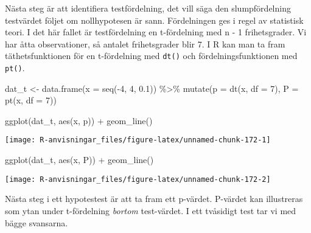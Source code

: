 \documentclass[
]{book}
\newenvironment{Shaded}{\begin{snugshade}}{\end{snugshade}}
\newcommand{\AttributeTok}[1]{\textcolor[rgb]{0.77,0.63,0.00}{#1}}
\newcommand{\DecValTok}[1]{\textcolor[rgb]{0.00,0.00,0.81}{#1}}
\newcommand{\FloatTok}[1]{\textcolor[rgb]{0.00,0.00,0.81}{#1}}
\newcommand{\FunctionTok}[1]{\textcolor[rgb]{0.00,0.00,0.00}{#1}}
\newcommand{\NormalTok}[1]{#1}
\newcommand{\OtherTok}[1]{\textcolor[rgb]{0.56,0.35,0.01}{#1}}
\newcommand{\SpecialCharTok}[1]{\textcolor[rgb]{0.00,0.00,0.00}{#1}}
\theoremstyle{definition}
\theoremstyle{definition}
\theoremstyle{definition}
\theoremstyle{definition}
\theoremstyle{remark}
\begin{document}
Nästa steg är att identifiera testfördelning, det vill säga den slumpfördelning testvärdet följet om nollhypotesen är sann. Fördelningen ges i regel av statistisk teori. I det här fallet är testfördelning en t-fördelning med n - 1 frihetsgrader. Vi har åtta observationer, så antalet frihetsgrader blir 7. I R kan man ta fram täthetsfunktionen för en t-fördelning med \texttt{dt()} och fördelningsfunktionen med \texttt{pt()}.

\begin{Shaded}
\begin{Highlighting}[]
\NormalTok{dat\_t }\OtherTok{\textless{}{-}} \FunctionTok{data.frame}\NormalTok{(}\AttributeTok{x =} \FunctionTok{seq}\NormalTok{(}\SpecialCharTok{{-}}\DecValTok{4}\NormalTok{, }\DecValTok{4}\NormalTok{, }\FloatTok{0.1}\NormalTok{)) }\SpecialCharTok{\%\textgreater{}\%} 
  \FunctionTok{mutate}\NormalTok{(}\AttributeTok{p =} \FunctionTok{dt}\NormalTok{(x, }\AttributeTok{df =} \DecValTok{7}\NormalTok{),}
         \AttributeTok{P =} \FunctionTok{pt}\NormalTok{(x, }\AttributeTok{df =} \DecValTok{7}\NormalTok{))}

\FunctionTok{ggplot}\NormalTok{(dat\_t, }\FunctionTok{aes}\NormalTok{(x, p)) }\SpecialCharTok{+}
  \FunctionTok{geom\_line}\NormalTok{()}
\end{Highlighting}
\end{Shaded}

\begin{center}\texttt{[image: R-anvisningar\_files/figure-latex/unnamed-chunk-172-1]} \end{center}

\begin{Shaded}
\begin{Highlighting}[]
\FunctionTok{ggplot}\NormalTok{(dat\_t, }\FunctionTok{aes}\NormalTok{(x, P)) }\SpecialCharTok{+}
  \FunctionTok{geom\_line}\NormalTok{()}
\end{Highlighting}
\end{Shaded}

\begin{center}\texttt{[image: R-anvisningar\_files/figure-latex/unnamed-chunk-172-2]} \end{center}

Nästa steg i ett hypotestest är att ta fram ett p-värdet. P-värdet kan illustreras som ytan under t-fördelning \emph{bortom} test-värdet. I ett tvåsidigt test tar vi med bägge svansarna.
\end{document}
